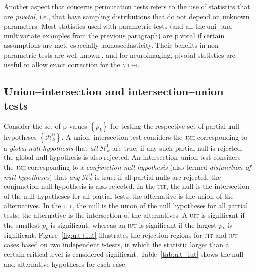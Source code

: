 Another aspect that concerns permutation tests refers to the use of statistics that are \emph{pivotal}, i.e., that have sampling distributions that do not depend on unknown parameters. Most statistics used with parametric tests (and all the uni- and multivariate examples from the previous paragraph) are pivotal if certain assumptions are met, especially homoscedasticity. Their benefits in non-parametric tests are well known \citep{Hall1991}, and for neuroimaging, pivotal statistics are useful to allow exact correction for the \textsc{mtp-i}.

\subsection{Union--intersection and intersection--union tests}
\label{sec:comb:uit+iut}

Consider the set of p-values $\left\{p_{k}\right\}$ for testing the respective set of partial null hypotheses $\left\{\mathcal{H}^{0}_{k}\right\}$. A union--intersection test \citep[\textsc{uit},][]{Roy1953} considers the \textsc{jnh} corresponding to a \emph{global null hypothesis} that \emph{all} $\mathcal{H}^{0}_{k}$ are true; if any such partial null is rejected, the global null hypothesis is also rejected. 
An intersection--union test \citep[\textsc{iut},][]{Berger1982} considers the \textsc{jnh} corresponding to a \emph{conjunction null hypothesis} (also termed \emph{disjunction of null hypotheses}) that \emph{any} $\mathcal{H}^{0}_{k}$ is true; if all partial nulls are rejected, the conjunction null hypothesis is also rejected. In the \textsc{uit}, the null is the intersection of the null hypotheses for all partial tests; the alternative is the union of the alternatives. In the \textsc{iut}, the null is the union of the null hypotheses for all partial tests; the alternative is the intersection of the alternatives. A \textsc{uit} is significant if the smallest $p_{k}$ is significant, whereas an \textsc{iut} is significant if the largest $p_{k}$ is significant. Figure~\ref{fig:uit+iut} illustrates the rejection regions for \textsc{uit} and \textsc{iut} cases based on two independent $t$-tests, in which the statistic larger than a certain critical level is considered significant. Table~\ref{tab:uit+iut} shows the null and alternative hypotheses for each case.


